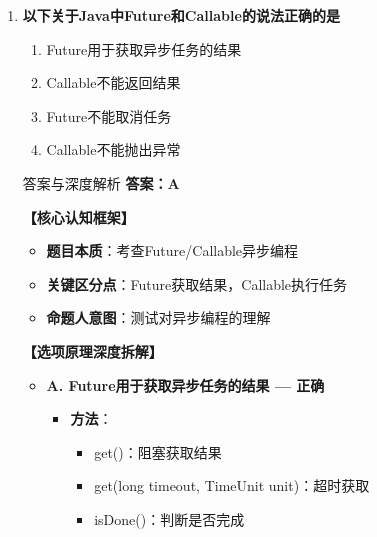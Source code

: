 \documentclass[12pt, a4paper]{ctexart}
\begin{document}
\begin{enumerate}[label=\textbf{\arabic*.}]
\begin{bluebox}{答案与深度解析}
		      \textbf{【命题趋势与实战策略】}

		      \textbf{考场秒杀技巧}：Semaphore permits=1 可作互斥锁
	      \end{bluebox}

	\item \textbf{以下关于Java中Future和Callable的说法正确的是}
	      \begin{enumerate}[label=\Alph*.]
		      \item Future用于获取异步任务的结果
		      \item Callable不能返回结果
		      \item Future不能取消任务
		      \item Callable不能抛出异常
	      \end{enumerate}

	      \begin{bluebox}{答案与深度解析}
		      \textbf{答案：A}

		      \textbf{【核心认知框架】}
		      \begin{itemize}[label={}, leftmargin=*, nosep]
			      \item \textbf{题目本质}：考查Future/Callable异步编程
			      \item \textbf{关键区分点}：Future获取结果，Callable执行任务
			      \item \textbf{命题人意图}：测试对异步编程的理解
		      \end{itemize}

		      \textbf{【选项原理深度拆解】}
					  \begin{itemize}[label={}, leftmargin=*, nosep]

		      \item \textbf{A. Future用于获取异步任务的结果 — 正确}
		      \begin{itemize}[label={}, leftmargin=*, nosep]
			      \item \textbf{方法}：
			            \begin{itemize}
				            \item get()：阻塞获取结果
				            \item get(long timeout, TimeUnit unit)：超时获取
				            \item isDone()：判断是否完成
			            \end{itemize}
		      \end{itemize}


\end{itemize}
\end{bluebox}
\end{enumerate}
\end{document}
